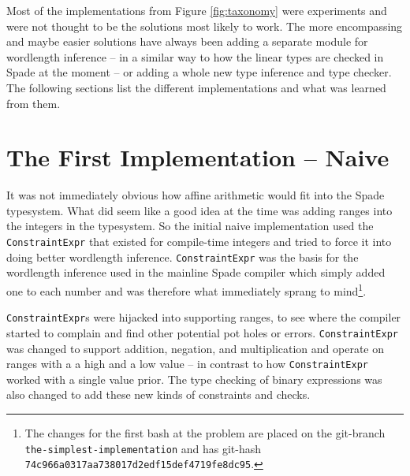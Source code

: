 Most of the implementations from Figure \ref{fig:taxonomy} were experiments and were not thought to be the solutions most likely to work. The more encompassing and maybe easier solutions have always been adding a separate module for wordlength inference -- in a similar way to how the linear types are checked in Spade at the moment -- or adding a whole new type inference and type checker. The following sections list the different implementations and what was learned from them.


\section{The First Implementation -- Naive}
\label{sec:First}

It was not immediately obvious how affine arithmetic would fit into the Spade typesystem. What did seem like a good idea at the time was adding ranges into the integers in the typesystem. So the initial naive implementation used the \verb+ConstraintExpr+ that existed for compile-time integers and tried to force it into doing better wordlength inference. \verb+ConstraintExpr+ was the basis for the wordlength inference used in the mainline Spade compiler which simply added one to each number and was therefore what immediately sprang to mind\cprotect\footnote{The changes for the first bash at the problem are placed on the git-branch \verb+the-simplest-implementation+ and has git-hash \verb+74c966a0317aa738017d2edf15def4719fe8dc95+.}.


\verb+ConstraintExpr+s were hijacked into supporting ranges, to see where the compiler started to complain and find other potential pot holes or errors. \verb+ConstraintExpr+ was changed to support addition, negation, and multiplication and operate on ranges with a a high and a low value -- in contrast to how \verb+ConstraintExpr+ worked with a single value prior. The type checking of binary expressions was also changed to add these new kinds of constraints and checks.

